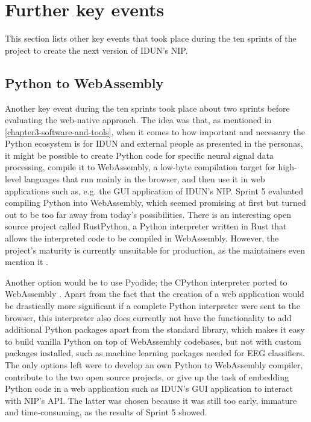 \chapter{Further key events}
\label{appendix4-further-key-events}
\graphicspath{{Appendix4/Figs/}{Appendix4/Figs/}}

This section lists other key events that took place during the ten sprints of the project to create the next version of IDUN's NIP.

\section*{Python to WebAssembly}
\label{chapter4-python-to-webassembly}

Another key event during the ten sprints took place about two sprints before evaluating the web-native approach. The idea was that, as mentioned in \autoref{chapter3-software-and-tools}, when it comes to how important and necessary the Python ecosystem is for IDUN and external people as presented in the personas, it might be possible to create Python code for specific neural signal data processing, compile it to WebAssembly, a low-byte compilation target for high-level languages that run mainly in the browser, and then use it in web applications such as, e.g. the GUI application of IDUN's NIP. Sprint 5 evaluated compiling Python into WebAssembly, which seemed promising at first but turned out to be too far away from today's possibilities. There is an interesting open source project called RustPython, a Python interpreter written in Rust that allows the interpreted code to be compiled in WebAssembly. However, the project's maturity is currently unsuitable for production, as the maintainers even mention it \citep{noauthor_rustpython_2022}.

Another option would be to use Pyodide; the CPython interpreter ported to WebAssembly \citep{noauthor_pyodide_2022}. Apart from the fact that the creation of a web application would be drastically more significant if a complete Python interpreter were sent to the browser, this interpreter also does currently not have the functionality to add additional Python packages apart from the standard library, which makes it easy to build vanilla Python on top of WebAssembly codebases, but not with custom packages installed, such as machine learning packages needed for EEG classifiers. The only options left were to develop an own Python to WebAssembly compiler, contribute to the two open source projects, or give up the task of embedding Python code in a web application such as IDUN's GUI application to interact with NIP's API. The latter was chosen because it was still too early, immature and time-consuming, as the results of Sprint 5 showed.

